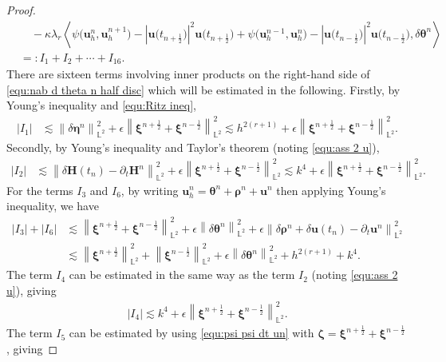 \documentclass[11pt, reqno]{amsart}
\theoremstyle{definition}
\theoremstyle{remark}
\numberwithin{equation}{section}
\newcommand{\bff}{\boldsymbol}
\newcommand{\bb}{\mathbb}
\newcommand{\norm}[2]{\left\|{#1}\right\|_{#2}}
\newcommand{\inpro}[2]{\left\langle#1,#2\right\rangle}
\newcommand{\abs}[1]{\left|{#1}\right|}
\begin{document}
\begin{proof}
\begin{align}
	\nonumber
	&\quad
	-\kappa \lambda_r \inpro{\psi\big(\bff{u}_h^n,\bff{u}_h^{n+1}\big) - \abs{\bff{u}\big(t_{n+\frac{1}{2}}\big)}^2 \bff{u}\big(t_{n+\frac{1}{2}}\big) + \psi\big(\bff{u}_h^{n-1}, \bff{u}_h^n\big) - \abs{\bff{u}\big(t_{n-\frac{1}{2}}\big)}^2 \bff{u}\big(t_{n-\frac{1}{2}}\big)}{\delta \bff{\theta}^n}
	\\
	&=: I_1+I_2+ \cdots + I_{16}.
\end{align}
There are sixteen terms involving inner products on the right-hand side of \eqref{equ:nab d theta n half disc} which will be estimated in the following. Firstly, by Young's inequality and \eqref{equ:Ritz ineq},
\begin{align}\label{equ:I1}
	\abs{I_1} 
	&\lesssim 
	\norm{\delta \bff{\eta}^n}{\bb{L}^2}^2
	+
	\epsilon \norm{\bff{\xi}^{n+\frac{1}{2}}+\bff{\xi}^{n-\frac{1}{2}}}{\bb{L}^2}^2
	\lesssim
	h^{2(r+1)}+ \epsilon\norm{\bff{\xi}^{n+\frac{1}{2}}+\bff{\xi}^{n-\frac{1}{2}}}{\bb{L}^2}^2.
\end{align}
Secondly, by Young's inequality and Taylor's theorem (noting \eqref{equ:ass 2 u}),
\begin{align*}
	\abs{I_2}
	&\lesssim
	\norm{\delta \bff{H}(t_n) - \partial_t \bff{H}^n}{\bb{L}^2}^2
	+
	\epsilon \norm{\bff{\xi}^{n+\frac{1}{2}}+\bff{\xi}^{n-\frac{1}{2}}}{\bb{L}^2}^2
	\lesssim
	k^4 + \epsilon\norm{\bff{\xi}^{n+\frac{1}{2}}+\bff{\xi}^{n-\frac{1}{2}}}{\bb{L}^2}^2.
\end{align*}
For the terms $I_3$ and $I_6$, by writing $\bff{u}_h^n= \bff{\theta}^n+\bff{\rho}^n+\bff{u}^n$ then applying Young's inequality, we have
\begin{align*}
	\nonumber
	\abs{I_3}+\abs{I_6}
	&\lesssim
	\norm{\bff{\xi}^{n+\frac{1}{2}}+\bff{\xi}^{n-\frac{1}{2}}}{\bb{L}^2}^2
	+
	\epsilon \norm{\delta \bff{\theta}^n}{\bb{L}^2}^2
	+
	\epsilon \norm{\delta \bff{\rho}^n+\delta \bff{u}(t_n)-\partial_t \bff{u}^n}{\bb{L}^2}^2
	\\
	&\lesssim
	\norm{\bff{\xi}^{n+\frac{1}{2}}}{\bb{L}^2}^2 + \norm{\bff{\xi}^{n-\frac{1}{2}}}{\bb{L}^2}^2
	+
	\epsilon \norm{\delta \bff{\theta}^n}{\bb{L}^2}^2
	+
	h^{2(r+1)} + k^4.
\end{align*}
The term $I_4$ can be estimated in the same way as the term $I_2$ (noting \eqref{equ:ass 2 u}), giving
\begin{align*}
	\abs{I_4} \lesssim k^4 + \epsilon\norm{\bff{\xi}^{n+\frac{1}{2}}+\bff{\xi}^{n-\frac{1}{2}}}{\bb{L}^2}^2.
\end{align*}
The term $I_5$ can be estimated by using \eqref{equ:psi psi dt un} with $\bff{\zeta}= \bff{\xi}^{n+\frac{1}{2}}+\bff{\xi}^{n-\frac{1}{2}}$, giving

\end{proof}
\end{document}
